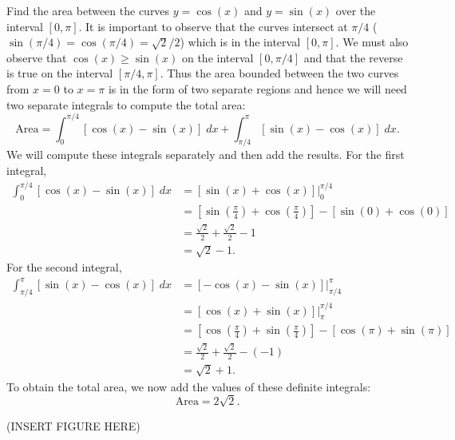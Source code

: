 \documentclass{ximera}
\begin{document}
\begin{example}
Find the area between the curves $y = \cos(x)$ and $y=\sin(x)$ over the interval $[0, \pi]$.
It is important to observe that the curves intersect at $\pi/4$  
($\sin(\pi/4) = \cos(\pi/4) = \sqrt2 / 2$) which is in the interval $[0, \pi]$. 
We must also observe that $\cos(x) \geq \sin(x)$ on the interval $[0, \pi/4]$ and
that the reverse is true on the interval $[\pi/4, \pi]$.
Thus the area bounded between the two curves from $x = 0$ to $x = \pi$ is in the form of two separate regions and hence 
we will need two separate integrals to compute the total area:
\[
\text{Area} = \int_0^{\pi/4} \left[\cos(x) - \sin(x)\right] \; dx + \int_{\pi/4}^\pi \left[\sin(x) -\cos(x)\right] \; dx.
\]
We will compute these integrals separately and then add the results.
For the first integral,
\begin{align*}
\int_0^{\pi/4} \left[\cos(x) - \sin(x)\right] \; dx &= \left[\sin(x) + \cos(x)\right]\bigg|_0^{\pi/4}\\
                                                    &= \left[\sin(\tfrac{\pi}{4}) + \cos(\tfrac{\pi}{4})\right]-\left[\sin(0) + \cos(0)\right]\\
                                                    &= \tfrac{\sqrt 2}{2} + \tfrac{\sqrt 2}{2} - 1\\
                                                    &= \sqrt{2} - 1.
\end{align*}
For the second integral,
\begin{align*}
\int_{\pi/4}^\pi \left[\sin(x) -\cos(x)\right] \; dx &= \left[-\cos(x) - \sin(x) \right]\bigg|_{\pi/4}^{\pi} \\
                                                     &= \left[\cos(x) + \sin(x)\right]\bigg|_{\pi}^{\pi/4}\\
                                                     &= \left[\cos(\tfrac{\pi}{4}) + \sin(\tfrac{\pi}{4})\right]-\left[\cos(\pi) + \sin(\pi)\right]\\
                                                     &= \tfrac{\sqrt 2}{2} + \tfrac{\sqrt 2}{2} - (-1)\\
                                                     &= \sqrt{2} + 1.
\end{align*}                                             
To obtain the total area, we now add the values of these definite integrals:
\[
\text{Area} = 2\sqrt{2}.
\]

(INSERT FIGURE HERE)


\end{example}
\end{document}
